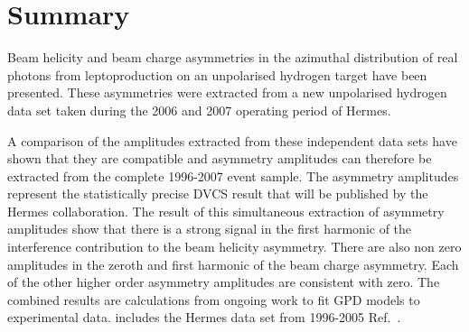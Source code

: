 \section{Summary}

Beam helicity and beam charge asymmetries in the azimuthal distribution of real photons from leptoproduction on an unpolarised hydrogen target have been presented. These asymmetries were extracted from a new unpolarised hydrogen data set taken during the 2006 and 2007 operating period of H{\sc ermes}.  

A comparison of the amplitudes extracted from these independent data sets have shown that they are compatible and asymmetry amplitudes can therefore be extracted from the complete 1996-2007 event sample. The   asymmetry amplitudes represent the statistically  precise DVCS result that will be published by the H{\sc ermes} collaboration. The result of this simultaneous extraction of asymmetry amplitudes show that there is a strong signal in the first harmonic of the interference contribution to the beam helicity asymmetry. There are also non zero amplitudes in the zeroth and first harmonic of the beam charge asymmetry. Each of the other higher order asymmetry amplitudes are consistent with zero. The combined results are  calculations from ongoing work to fit GPD models to experimental data.  includes the H{\sc ermes} data set from 1996-2005 Ref.~\cite{Air09}. 


